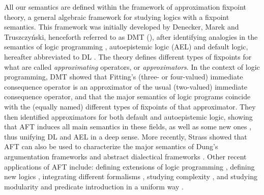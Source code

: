 \documentclass[runningheads]{llncs}
\begin{document}
{All our semantics are defined within the framework of approximation fixpoint theory, a general algebraic framework for studying logics with a fixpoint semantics.
This framework was initially developed by Denecker, Marek and Truszczy\'nski, henceforth referred to as DMT (\cite{DeneckerMT00}), after identifying analogies in the semantics of logic programming , autoepistemic logic (AEL) \cite{mo85} and default logic, hereafter abbreviated to DL \cite{ai/Reiter80}.
The theory defines different types of fixpoints for what are called \emph{approximating} operators, or \emph{approximators}.
In the context of logic programming, DMT \cite{DeneckerMT00} showed that Fitting's (three- or four-valued) immediate consequence operator is an approximator of the usual (two-valued) immediate consequence operator, and that the major semantics of logic programs coincide with the (equally named) different types of fixpoints of that approximator.
They then identified approximators for both default and autoepistemic logic, showing that AFT induces all main semantics in these fields, as well as some new ones \cite{DeneckerMT03}, thus unifying DL and AEL in a deep sense.
More recently, Strass \cite{journals/ai/Strass13} showed that AFT can also be used to characterize the major semantics of Dung's argumentation frameworks  and abstract dialectical frameworks .
Other recent applications of AFT include: defining extensions of logic programming \cite{lpnmr/AnticEF13}, defining new logics \cite{iclp/BogaertsVDV14}, integrating different formalisms \cite{RR/BiJF14}, studying complexity \cite{kr/StrassW14}, and studying modularity and predicate introduction in a uniform way \cite{tocl/VennekensGD06,VennekensMWD07a,VennekensMWD07b}. 

}
\end{document}
